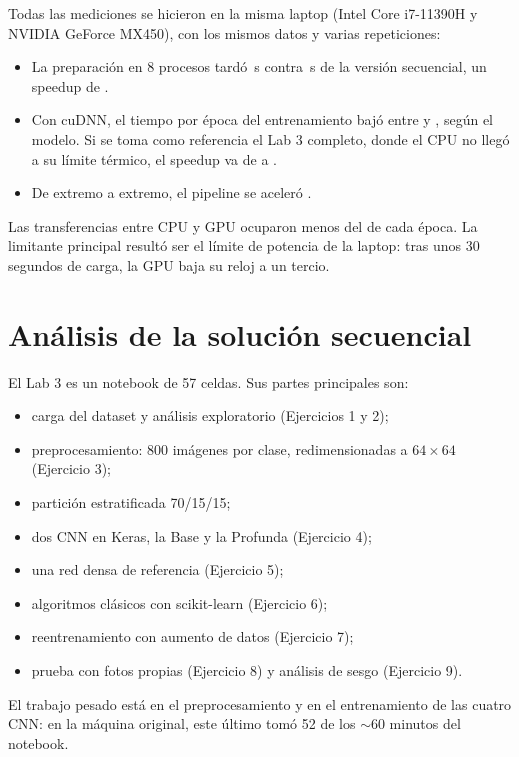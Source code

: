\documentclass[11pt,letterpaper]{article}
\begin{document}
Todas las mediciones se hicieron en la misma laptop (Intel Core i7-11390H y NVIDIA GeForce MX450), con los mismos datos y varias repeticiones:
\begin{itemize}
  \item La preparación en 8 procesos tardó \PrepPar\,s contra \PrepSeq\,s de la versión secuencial, un speedup de \PrepSpeedup.
  \item Con cuDNN, el tiempo por época del entrenamiento bajó entre \SpeedupMin{} y \SpeedupMax{}, según el modelo. Si se toma como referencia el Lab 3 completo, donde el CPU no llegó a su límite térmico, el speedup va de \SpeedupBaseLab{} a \SpeedupProfundaLab.
  \item De extremo a extremo, el pipeline se aceleró \SpeedupTotal.
\end{itemize}
Las transferencias entre CPU y GPU ocuparon menos del \TransfMaxPct{} de cada época. La limitante principal resultó ser el límite de potencia de la laptop: tras unos 30 segundos de carga, la GPU baja su reloj a un tercio.

\section{Análisis de la solución secuencial}

El Lab 3 es un notebook de 57 celdas. Sus partes principales son:
\begin{itemize}
  \item carga del dataset y análisis exploratorio (Ejercicios 1 y 2);
  \item preprocesamiento: 800 imágenes por clase, redimensionadas a $64\times64$ (Ejercicio 3);
  \item partición estratificada 70/15/15;
  \item dos CNN en Keras, la Base y la Profunda (Ejercicio 4);
  \item una red densa de referencia (Ejercicio 5);
  \item algoritmos clásicos con scikit-learn (Ejercicio 6);
  \item reentrenamiento con aumento de datos (Ejercicio 7);
  \item prueba con fotos propias (Ejercicio 8) y análisis de sesgo (Ejercicio 9).
\end{itemize}
El trabajo pesado está en el preprocesamiento y en el entrenamiento de las cuatro CNN: en la máquina original, este último tomó 52 de los $\sim$60 minutos del notebook.
\end{document}
